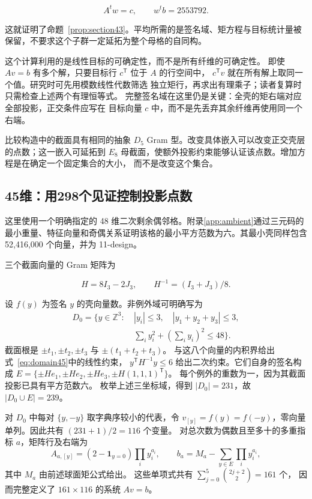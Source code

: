 \[
A^tw=c,\qquad w^tb=2553792.
\]

这就证明了命题~\ref{prop:section43}。平均所需的是签名域、矩方程与目标统计量被保留，不要求这个子群一定延拓为整个母格的自同构。

这个计算利用的是线性目标的可确定性，而不是所有纤维的可确定性。
即使 $Av=b$ 有多个解，只要目标行 $c^{\mathsf T}$ 位于 $A$ 的行空间中，
$c^{\mathsf T}v$ 就在所有解上取同一个值。研究时可先用模数线性代数筛选
独立矩行，再求出有理乘子；读者复算时只需检查上述两个有理恒等式。
完整签名域在这里仍是关键：全壳的矩右端对应全部投影，正交条件应写在
目标向量 $c$ 中，而不是先丢弃其余纤维再使用同一个右端。

比较构造中的截面具有相同的抽象 \(D_5\) Gram
型。改变具体嵌入可以改变正交壳层的点数；这一嵌入可延拓到 \(E_8\)
母截面，使额外投影约束能够认证该点数。增加方程是在确定一个固定集合的大小，
而不是改变这个集合。

\subsection{45维：用298个见证控制投影点数}

这里使用一个明确指定的 48
维二次剩余偶邻格。附录\ref{app:ambient}通过三元码的最小重量、特征向量和奇偶关系证明该格的最小平方范数为六。其最小壳同样包含
52,416,000 个向量，并为 11-design。

三个截面向量的 Gram 矩阵为

\[
H=8I_3-2J_3,\qquad H^{-1}=(I_3+J_3)/8.
\]

设 $f(y)$ 为签名 $y$ 的壳向量数。非例外域可明确写为
\begin{equation}
\begin{split}
D_0=\{y\in\mathbb Z^3:\ &|y_i|\le3,\quad |y_1+y_2+y_3|\le3,\\
&\textstyle\sum_i y_i^2+(\sum_i y_i)^2\le48\}.
\end{split}
\label{eq:domain45}
\end{equation}
截面根是 $\pm t_1,\pm t_2,\pm t_3$ 与 $\pm(t_1+t_2+t_3)$。
与这八个向量的内积界给出式~\eqref{eq:domain45}中的线性约束，
$y^{\mathsf T}H^{-1}y\le6$ 给出二次约束。它们自身的签名构成
$E=\{\pm He_1,\pm He_2,\pm He_3,\pm H(1,1,1)^{\mathsf T}\}$。
每个例外的重数为一，因为其截面投影已具有平方范数六。
枚举上述三坐标域，得到 $|D_0|=231$，故 $|D_0\cup E|=239$。

对 $D_0$ 中每对 $\{y,-y\}$ 取字典序较小的代表，令
$v_{[y]}=f(y)=f(-y)$，零向量单列。因此共有 $(231+1)/2=116$ 个变量。
对总次数为偶数且至多十的多重指标 $a$，矩阵行及右端为
\[
A_{a,[y]}=(2-\mathbf1_{y=0})\prod_i y_i^{a_i},\qquad
b_a=M_a-\sum_{y\in E}\prod_i y_i^{a_i},
\]
其中 $M_a$ 由前述球面矩公式给出。
这些单项式共有 $\sum_{j=0}^5\binom{2j+2}{2}=161$ 个，
因而完整定义了 $161\times116$ 的系统 $Av=b$。

